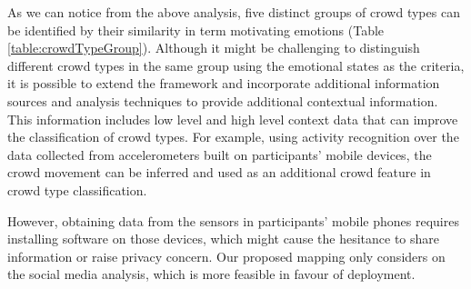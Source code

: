 As we can notice from the above analysis, five distinct groups of crowd types can be identified by their similarity in term motivating emotions (Table \ref{table:crowdTypeGroup}). Although it might be challenging to distinguish different crowd types in the same group using the emotional states as the criteria, it is possible to extend the framework and incorporate additional information sources and analysis techniques to provide additional contextual information. This information includes low level and high level context data that can improve the classification of crowd types. For example, using activity recognition over the data collected from accelerometers built on participants' mobile devices, the crowd movement can be inferred and used as an additional crowd feature in crowd type classification. 

However, obtaining data from the sensors in participants' mobile phones requires installing software on those devices, which might cause the hesitance to share information or raise privacy concern. Our proposed mapping only considers on the social media analysis, which is more feasible in favour of deployment.

